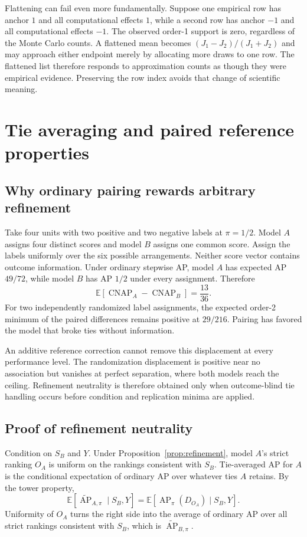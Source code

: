 \documentclass[11pt]{article}
\newcommand{\AP}{\operatorname{AP}}
\newcommand{\CNAP}{\operatorname{CNAP}}
\newcommand{\E}{\mathbb{E}}
\newcommand{\APta}{\widetilde{\AP}}
\theoremstyle{remark}
\begin{document}
Flattening can fail even more fundamentally. Suppose one empirical row has
anchor $1$ and all computational effects $1$, while a second row has anchor
$-1$ and all computational effects $-1$. The observed order-1 support is zero,
regardless of the Monte Carlo counts. A flattened mean becomes
$(J_1-J_2)/(J_1+J_2)$ and may approach either endpoint merely by allocating
more draws to one row. The flattened list therefore responds to approximation
counts as though they were empirical evidence. Preserving the row index avoids
that change of scientific meaning.


\section{Tie averaging and paired reference properties}
\label{app:paired-proofs}

\subsection{Why ordinary pairing rewards arbitrary refinement}

Take four units with two positive and two negative labels at $\pi=1/2$.
Model $A$ assigns four distinct scores and model $B$ assigns one common score.
Assign the labels uniformly over the six possible arrangements. Neither score
vector contains outcome information. Under ordinary stepwise AP, model $A$ has
expected AP $49/72$, while model $B$ has AP $1/2$ under every assignment.
Therefore
\[
\E[\CNAP_A-\CNAP_B]=\frac{13}{36}.
\]
For two independently randomized label assignments, the expected order-2
minimum of the paired differences remains positive at $29/216$. Pairing has
favored the model that broke ties without information.

An additive reference correction cannot remove this displacement at every
performance level. The randomization displacement is positive near no
association but vanishes at perfect separation, where both models reach the
ceiling. Refinement neutrality is therefore obtained only when outcome-blind
tie handling occurs before condition and replication minima are applied.

\subsection{Proof of refinement neutrality}

Condition on $S_B$ and $Y$. Under Proposition~\ref{prop:refinement}, model
$A$'s strict ranking $O_A$ is uniform on the rankings consistent with $S_B$.
Tie-averaged AP for $A$ is the conditional expectation of ordinary AP over
whatever ties $A$ retains. By the tower property,
\[
\E[\APta_{A,\pi}\mid S_B,Y]
=
\E[\AP_\pi(D_{O_A})\mid S_B,Y].
\]
Uniformity of $O_A$ turns the right side into the average of ordinary AP over
all strict rankings consistent with $S_B$, which is $\APta_{B,\pi}$.
\end{document}
